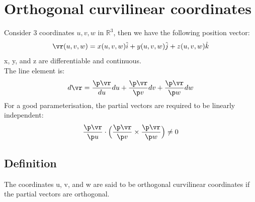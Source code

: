 \documentclass[a4paper, 11pt, normalem]{report}
\begin{document}
\section{Orthogonal curvilinear coordinates}
Consider 3 coordinates $u, v, w$ in $\mathbb{R}^3$, then we have the following position vector:
\begin{equation*}
    \vr(u,v,w) = x(u,v,w)\hat{i} + y(u,v,w)\hat{j} + z(u,v,w)\hat{k}
\end{equation*}
x, y, and z are differentiable and continuous. \\
The line element is:
\begin{equation*}
    d\vr = \frac{\p \vr}{du}du + \frac{\p \vr}{\p v}dv + \frac{\p \vr}{\p w}dw
\end{equation*}
For a good parameterisation, the partial vectors are required to be linearly independent:
\begin{equation*}
    \frac{\p \vr}{\p u} \cdot \Big(\frac{\p \vr}{\p v} \times \frac{\p \vr}{\p w} \Big) \neq 0
\end{equation*}

\subsection{Definition}
The coordinates u, v, and w are said to be orthogonal curvilinear coordinates if the partial vectors are orthogonal.
\end{document}

